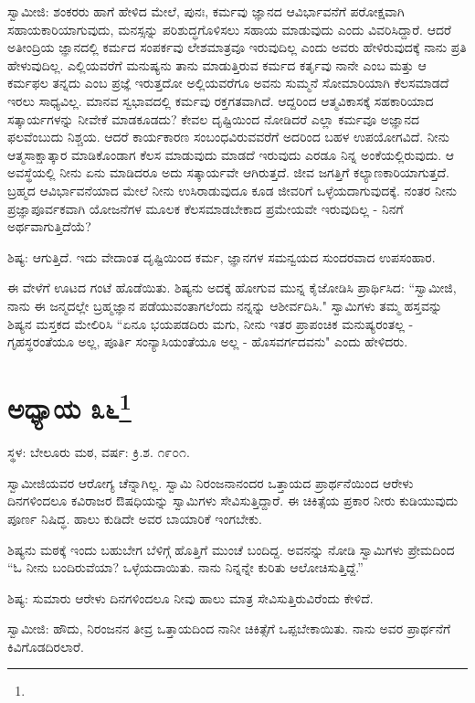 ಸ್ವಾಮೀಜಿ: ಶಂಕರರು ಹಾಗೆ ಹೇಳಿದ ಮೇಲೆ, ಪುನಃ, ಕರ್ಮವು ಜ್ಞಾನದ ಆವಿರ್ಭಾವನೆಗೆ ಪರೋಕ್ಷವಾಗಿ ಸಹಾಯಕಾರಿಯಾಗುವುದು, ಮನಸ್ಸನ್ನು ಪರಿಶುದ್ಧಗೊಳಿಸಲು ಸಹಾಯ ಮಾಡುವುದು ಎಂದು ವಿವರಿಸಿದ್ದಾರೆ. ಆದರೆ ಅತೀಂದ್ರಿಯ ಜ್ಞಾನದಲ್ಲಿ ಕರ್ಮದ ಸಂಪರ್ಕವು ಲೇಶಮಾತ್ರವೂ ಇರುವುದಿಲ್ಲ ಎಂದು ಅವರು ಹೇಳಿರುವುದಕ್ಕೆ ನಾನು ಪ್ರತಿ ಹೇಳುವುದಿಲ್ಲ. ಎಲ್ಲಿಯವರೆಗೆ ಮನುಷ್ಯನು ತಾನು ಮಾಡುತ್ತಿರುವ ಕರ್ಮದ ಕರ್ತೃವು ನಾನೇ ಎಂಬ ಮತ್ತು ಆ ಕರ್ಮಫಲ ತನ್ನದು ಎಂಬ ಪ್ರಜ್ಞೆ ಇರುತ್ತದೋ ಅಲ್ಲಿಯವರೆಗೂ ಅವನು ಸುಮ್ಮನೆ ಸೋಮಾರಿಯಾಗಿ ಕೆಲಸಮಾಡದೆ ಇರಲು ಸಾಧ್ಯವಿಲ್ಲ. ಮಾನವ ಸ್ವಭಾವದಲ್ಲಿ ಕರ್ಮವು ರಕ್ತಗತವಾಗಿದೆ. ಆದ್ದರಿಂದ ಆತ್ಮವಿಕಾಸಕ್ಕೆ ಸಹಕಾರಿಯಾದ ಸತ್ಕಾರ್ಯಗಳನ್ನು ನೀವೇಕೆ ಮಾಡಕೂಡದು? ಕೇವಲ ದೃಷ್ಟಿಯಿಂದ ನೋಡಿದರೆ ಎಲ್ಲಾ ಕರ್ಮವೂ ಅಜ್ಞಾನದ ಫಲವೆಂಬುದು ನಿಶ್ಚಯ. ಆದರೆ ಕಾರ್ಯಕಾರಣ ಸಂಬಂಧವಿರುವವರೆಗೆ ಅದರಿಂದ ಬಹಳ ಉಪಯೋಗವಿದೆ. ನೀನು ಆತ್ಮಸಾಕ್ಷಾತ್ಕಾರ ಮಾಡಿಕೊಂಡಾಗ ಕೆಲಸ ಮಾಡುವುದು ಮಾಡದೆ ಇರುವುದು ಎರಡೂ ನಿನ್ನ ಅಂಕೆಯಲ್ಲಿರುವುದು. ಆ ಅವಸ್ಥೆಯಲ್ಲಿ ನೀನು ಏನು ಮಾಡಿದರೂ ಅದು ಸತ್ಕಾರ್ಯವೇ ಆಗಿರುತ್ತದೆ. ಜೀವ ಜಗತ್ತಿಗೆ ಕಲ್ಯಾಣಕಾರಿಯಾಗುತ್ತದೆ. ಬ್ರಹ್ಮದ ಆವಿರ್ಭಾವನೆಯಾದ ಮೇಲೆ ನೀನು ಉಸಿರಾಡುವುದೂ ಕೂಡ ಜೀವರಿಗೆ ಒಳ್ಳೆಯದಾಗುವುದಕ್ಕೆ. ನಂತರ ನೀನು ಪ್ರಜ್ಞಾಪೂರ್ವಕವಾಗಿ ಯೋಜನೆಗಳ ಮೂಲಕ ಕೆಲಸಮಾಡಬೇಕಾದ ಪ್ರಮೇಯವೇ ಇರುವುದಿಲ್ಲ - ನಿನಗೆ ಅರ್ಥವಾಗುತ್ತಿದೆಯೆ?

ಶಿಷ್ಯ: ಆಗುತ್ತಿದೆ. ಇದು ವೇದಾಂತ ದೃಷ್ಟಿಯಿಂದ ಕರ್ಮ, ಜ್ಞಾನಗಳ ಸಮನ್ವಯದ ಸುಂದರವಾದ ಉಪಸಂಹಾರ.

ಈ ವೇಳೆಗೆ ಊಟದ ಗಂಟೆ ಹೊಡೆಯಿತು. ಶಿಷ್ಯನು ಅದಕ್ಕೆ ಹೋಗುವ ಮುನ್ನ ಕೈಜೋಡಿಸಿ ಪ್ರಾರ್ಥಿಸಿದ: “ಸ್ವಾಮೀಜಿ, ನಾನು ಈ ಜನ್ಮದಲ್ಲೇ ಬ್ರಹ್ಮಜ್ಞಾನ ಪಡೆಯುವಂತಾಗಲೆಂದು ನನ್ನನ್ನು ಆಶೀರ್ವದಿಸಿ." ಸ್ವಾಮಿಗಳು ತಮ್ಮ ಹಸ್ತವನ್ನು ಶಿಷ್ಯನ ಮಸ್ತಕದ ಮೇಲಿರಿಸಿ “ಏನೂ ಭಯಪಡದಿರು ಮಗು, ನೀನು ಇತರ ಪ್ರಾಪಂಚಿಕ ಮನುಷ್ಯರಂತಲ್ಲ - ಗೃಹಸ್ಥರಂತೆಯೂ ಅಲ್ಲ, ಪೂರ್ತಿ ಸಂನ್ಯಾಸಿಯಂತೆಯೂ ಅಲ್ಲ - ಹೊಸವರ್ಗದವನು" ಎಂದು ಹೇಳಿದರು.

\newpage

\chapter[ಅಧ್ಯಾಯ ೩೬]{ಅಧ್ಯಾಯ ೩೬\protect\footnote{}}

\centerline{ಸ್ಥಳ: ಬೇಲೂರು ಮಠ, ವರ್ಷ: ಕ್ರಿ.ಶ. ೧೯೦೧.}

ಸ್ವಾಮೀಜಿಯವರ ಆರೋಗ್ಯ ಚೆನ್ನಾಗಿಲ್ಲ. ಸ್ವಾಮಿ ನಿರಂಜನಾನಂದರ ಒತ್ತಾಯದ ಪ್ರಾರ್ಥನೆಯಿಂದ ಆರೇಳು ದಿನಗಳಿಂದಲೂ ಕವಿರಾಜರ ಔಷಧಿಯನ್ನು ಸ್ವಾಮಿಗಳು ಸೇವಿಸುತ್ತಿದ್ದಾರೆ. ಈ ಚಿಕಿತ್ಸೆಯ ಪ್ರಕಾರ ನೀರು ಕುಡಿಯುವುದು ಪೂರ್ಣ ನಿಷಿದ್ಧ. ಹಾಲು ಕುಡಿದೇ ಅವರ ಬಾಯಾರಿಕೆ ಇಂಗಬೇಕು.

ಶಿಷ್ಯನು ಮಠಕ್ಕೆ ಇಂದು ಬಹುಬೇಗ ಬೆಳಿಗ್ಗೆ ಹೊತ್ತಿಗೆ ಮುಂಚೆ ಬಂದಿದ್ದ. ಅವನನ್ನು ನೋಡಿ ಸ್ವಾಮಿಗಳು ಪ್ರೇಮದಿಂದ “ಓ ನೀನು ಬಂದಿರುವೆಯಾ? ಒಳ್ಳೆಯದಾಯಿತು. ನಾನು ನಿನ್ನನ್ನೇ ಕುರಿತು ಆಲೋಚಿಸುತ್ತಿದ್ದೆ.”

ಶಿಷ್ಯ: ಸುಮಾರು ಆರೇಳು ದಿನಗಳಿಂದಲೂ ನೀವು ಹಾಲು ಮಾತ್ರ ಸೇವಿಸುತ್ತಿರುವಿರೆಂದು ಕೇಳಿದೆ.

ಸ್ವಾಮೀಜಿ: ಹೌದು, ನಿರಂಜನನ ತೀವ್ರ ಒತ್ತಾಯದಿಂದ ನಾನೀ ಚಿಕಿತ್ಸೆಗೆ ಒಪ್ಪಬೇಕಾಯಿತು. ನಾನು ಅವರ ಪ್ರಾರ್ಥನೆಗೆ ಕಿವಿಗೊಡದಿರಲಾರೆ.

